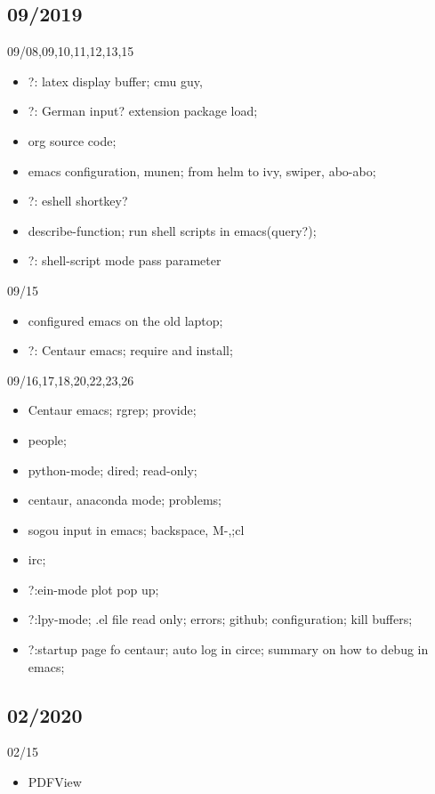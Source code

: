 \documentclass[11pt]{article}
\begin{document}
\subsection{09/2019}
\label{sec:org22bdbe7}
09/08,09,10,11,12,13,15
\begin{itemize}
\item ?: latex display buffer; cmu guy,
\item ?: German input? extension package load;
\item org source code;

\item emacs configuration, munen; from helm to ivy, swiper, abo-abo;

\item ?: eshell shortkey?
\item describe-function; run shell scripts in emacs(query?);

\item ?: shell-script mode pass parameter
\end{itemize}

09/15
\begin{itemize}
\item configured emacs on the old laptop;
\item ?: Centaur emacs; require and install;
\end{itemize}

09/16,17,18,20,22,23,26
\begin{itemize}
\item Centaur emacs; rgrep; provide;

\item people;

\item python-mode; dired; read-only;

\item centaur, anaconda mode; problems;

\item sogou input in emacs; backspace, M-,;cl

\item irc;
\item ?:ein-mode plot pop up;
\item ?:lpy-mode; .el file read only; errors; github;  configuration; kill buffers;
\item ?:startup page fo centaur; auto log in circe; summary on how to debug in emacs;
\end{itemize}
\subsection{02/2020}
\label{sec:org3b6aa65}
02/15
\begin{itemize}
\item PDFView
\end{itemize}
\end{document}
